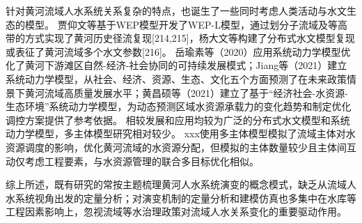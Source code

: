 针对黄河流域人水系统关系复杂的特点，也诞生了一些同时考虑人类活动与水文生态的模型。
贾仰文等基于WEP模型开发了WEP-L模型，通过划分子流域及等高带的方式实现了黄河历史径流复现[214,215]，杨大文等构建了分布式水文模型复现或表征了黄河流域多个水文参数[216]。
岳瑜素等（2020）应用系统动力学模型优化了黄河下游滩区自然-经济-社会协同的可持续发展模式；Jiang等（2021）建立系统动力学模型，从社会、经济、资源、生态、文化五个方面预测了在未来政策情景下黄河流域高质量发展水平；黄昌硕等（2021）建立了基于“经济社会-水资源-生态环境”系统动力学模型，为动态预测区域水资源承载力的变化趋势和制定优化调控方案提供了参考依据。
相较发展和应用均较为广泛的分布式水文模型和系统动力学模型，多主体模型研究相对较少。
xxx使用多主体模型模拟了流域主体对水资源调度的影响，优化黄河流域的水资源分配，但模拟的主体数量较少且主体间互动仅考虑工程要素，与水资源管理的联合多目标优化相似。

综上所述，既有研究的常按主题梳理黄河人水系统演变的概念模式，缺乏从流域人水系统视角出发的定量分析；对演变机制的定量分析和建模仿真也多集中在水库等工程因素影响上，忽视流域等水治理政策对流域人水关系变化的重要驱动作用。
